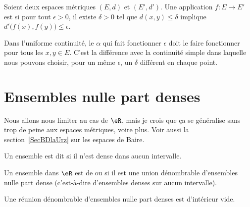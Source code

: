 \begin{definition}\label{DEFooYIPXooQTscbG}
    Soient deux espaces métriques \( (E,d)\) et \( (E',d')\). Une application \( f\colon E\to E'\) est  si pour tout \( \epsilon>0\), il existe \( \delta>0\) tel que \( d(x,y)\leq \delta\) implique \( d'\big( f(x),f(y) \big)\leq \epsilon\).
\end{definition}
Dans l'uniforme continuité, le \( \alpha\) qui fait fonctionner \( \epsilon\) doit le faire fonctionner pour tous les \( x,y\in E\). C'est la différence avec la continuité simple dans laquelle nous pouvons choisir, pour un même \( \epsilon\), un \( \delta\) différent en chaque point.

\section{Ensembles nulle part denses}

Nous allons nous limiter au cas de \( \eR\), mais je crois que ça se généralise sans trop de peine aux espaces métriques, voire plus. Voir aussi la section~\ref{SecBDlaUrz} sur les espaces de Baire.

\begin{definition}
    Un ensemble est dit  si il n'est dense dans aucun intervalle.

    Un ensemble dans \( \eR\) est de  ou  si il est une union dénombrable d'ensembles nulle part dense (c'est-à-dire d'ensembles denses sur aucun intervalle).
\end{definition}

\begin{theorem}      \label{ThoQGalIO}
    Une réunion dénombrable d'ensembles nulle part denses est d'intérieur vide.
\end{theorem}


